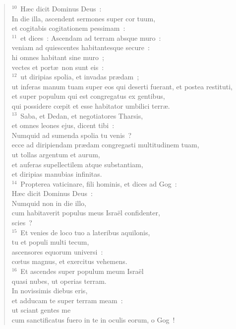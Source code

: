 \begin{flushleft}\begin{verse}${}^{10}$~H\ae c dicit Dominus Deus~:\\ In die illa, ascendent sermones super cor tuum,\\ et cogitabis cogitationem pessimam~:\\
${}^{11}$~et dices~: Ascendam ad terram absque muro~:\\ veniam ad quiescentes habitantesque secure~:\\ hi omnes habitant sine muro~;\\ vectes et port\ae\ non sunt eis~:\\
${}^{12}$~ut diripias spolia, et invadas pr\ae dam~;\\ ut inferas manum tuam super eos qui deserti fuerant, et postea restituti,\\ et super populum qui est congregatus ex gentibus,\\ qui possidere cœpit et esse habitator umbilici terr\ae .\\
${}^{13}$~Saba, et Dedan, et negotiatores Tharsis,\\ et omnes leones ejus, dicent tibi~:\\ Numquid ad sumenda spolia tu venis~?\\ ecce ad diripiendam pr\ae dam congregasti multitudinem tuam,\\ ut tollas argentum et aurum,\\ et auferas supellectilem atque substantiam,\\ et diripias manubias infinitas.\\
${}^{14}$~Propterea vaticinare, fili hominis, et dices ad Gog~:\\ H\ae c dicit Dominus Deus~:\\ Numquid non in die illo,\\ cum habitaverit populus meus Isra\"el confidenter,\\ scies~?\\
${}^{15}$~Et venies de loco tuo a lateribus aquilonis,\\ tu et populi multi tecum,\\ ascensores equorum universi~:\\ cœtus magnus, et exercitus vehemens.\\
${}^{16}$~Et ascendes super populum meum Isra\"el\\ quasi nubes, ut operias terram.\\ In novissimis diebus eris,\\ et adducam te super terram meam~:\\ ut sciant gentes me\\ cum sanctificatus fuero in te in oculis eorum, o Gog~!\end{verse}\end{flushleft}


